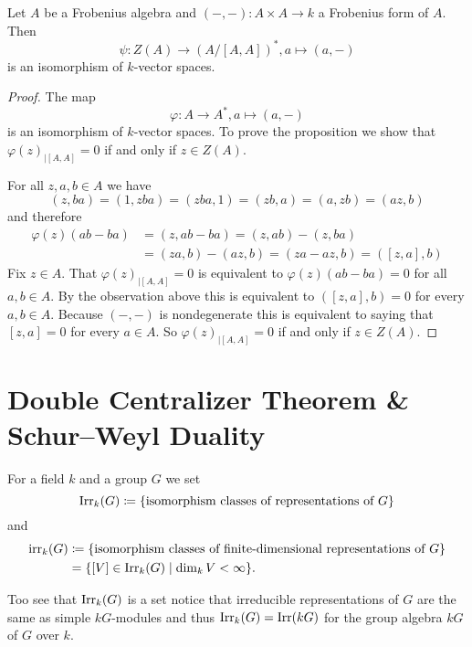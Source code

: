 \begin{prop}
  Let $A$ be a Frobenius algebra and $(-,-) \colon A \times A \to k$ a Frobenius form of $A$. Then
  \[
            \psi
    \colon  Z(A)
    \to     (A/[A,A])^*,
            a
    \mapsto (a,-)
  \]
  is an isomorphism of $k$-vector spaces.
\end{prop}
\begin{proof}
  The map
  \[
            \varphi
    \colon  A
    \to     A^*,
            a
    \mapsto (a, -)
  \]
  is an isomorphism of $k$-vector spaces.
  To prove the proposition we show that $\varphi(z)_{|[A,A]} = 0$ if and only if $z \in Z(A)$.
  
  For all $z, a, b \in A$ we have
  \[
      (z,ba)
    = (1,zba)
    = (zba,1)
    = (zb,a)
    = (a,zb)
    = (az,b)
  \]
  and therefore
  \begin{align*}
        \varphi(z)(ab-ba)
    &=  (z,ab-ba)
     =  (z,ab) - (z,ba) \\
    &=  (za,b) - (az,b)
     =  (za-az,b)
     =  ([z,a],b)
  \end{align*}
  Fix $z \in A$.
  That $\varphi(z)_{|[A,A]} = 0$ is equivalent to $\varphi(z)(ab-ba) = 0$ for all $a,b \in A$.
  By the observation above this is equivalent to $([z,a],b) = 0$ for every $a,b \in A$.
  Because $(-,-)$ is nondegenerate this is equivalent to saying that $[z,a] = 0$ for every $a \in A$.
  So $\varphi(z)_{|[A,A]} = 0$ if and only if $z \in Z(A)$.
\end{proof}





\section{Double Centralizer Theorem \& Schur--Weyl Duality}


\begin{defi}
  For a field $k$ and a group $G$ we set
  \[
              \operatorname{Irr}_k(G)
    \coloneqq \{ \text{isomorphism classes of representations of $G$} \}
  \]
  and
  \begin{align*}
                \operatorname{irr}_k(G)
    &\coloneqq  \{ \text{isomorphism classes of finite-dimensional representations of $G$} \} \\
    &=          \{ [V] \in \operatorname{Irr}_k(G) \mid \dim_k V < \infty \}.
  \end{align*}
\end{defi}


Too see that $\operatorname{Irr}_k(G)$ is a set notice that irreducible representations of $G$ are the same as simple $kG$-modules and thus $\operatorname{Irr}_k(G) = \operatorname{Irr}(kG)$ for the group algebra $kG$ of $G$ over $k$.


